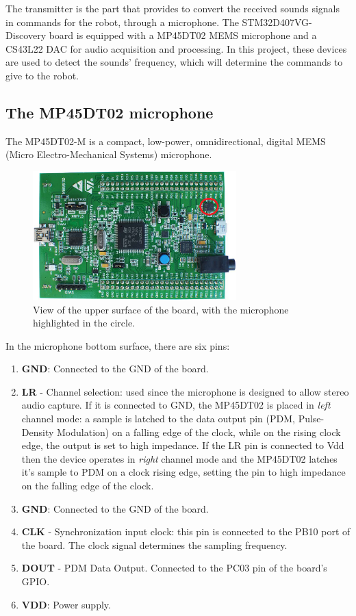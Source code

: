 The transmitter is the part that provides to convert the received sounds signals in commands for the robot, through a microphone. The STM32D407VG-Discovery board is equipped with a MP45DT02 MEMS microphone and a CS43L22 DAC for audio acquisition and processing. In this project, these devices are used to detect the sounds' frequency, which will determine the commands to give to the robot.

\subsection{The MP45DT02 microphone}
The MP45DT02-M is a compact, low-power, omnidirectional, digital MEMS (Micro Electro-Mechanical Systems) microphone.
\begin{figure}[H]
	\hspace*{0.15 \textwidth}\includegraphics[width= 0.7\textwidth]
	{files/images/board_view}
	\caption{View of the upper surface of the board, with the microphone highlighted in the circle.}
\end{figure}

In the microphone bottom surface, there are six pins:
\begin{enumerate}
	\item \textbf{GND}: Connected to the GND of the board.
	\item \textbf{LR} - Channel selection: used since the microphone is designed to allow stereo audio capture. If it is connected to GND, the MP45DT02 is placed in \textit{left} channel mode: a sample is latched to the data output pin (PDM, Pulse-Density Modulation) on a falling edge of the clock, while on the rising clock edge, the output is set to high impedance. If the LR pin is connected to Vdd then the device operates in \textit{right} channel mode and the MP45DT02 latches it's sample to PDM on a clock rising edge, setting the pin to high impedance on the falling edge of the clock.
	\item \textbf{GND}: Connected to the GND of the board.
	\item \textbf{CLK} - Synchronization input clock: this pin is connected to the PB10 port of the board. The clock signal determines the sampling frequency.
	\item \textbf{DOUT} - PDM Data Output. Connected to the PC03 pin of the board's GPIO.
	\item \textbf{VDD}: Power supply.
\end{enumerate}

